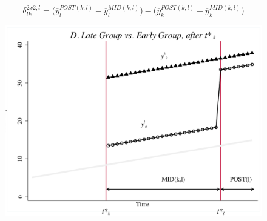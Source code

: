 \documentclass[notes=show]{beamer}
\begin{document}
\begin{frame}[plain]
$$\delta_{lk}^{2x2,l} = \bigg ( \overline{y}_l^{POST(k,l)} - \overline{y}_l^{MID(k,l)} \bigg ) - \bigg ( \overline{y}_k^{POST(k,l)} - \overline{y}_k^{MID(k,l)} \bigg ) $$

	\begin{figure}
	\includegraphics[scale=0.5]{./lecture_includes/bacon_goodman_7.png}
	\end{figure}

\end{frame}




\end{document}
